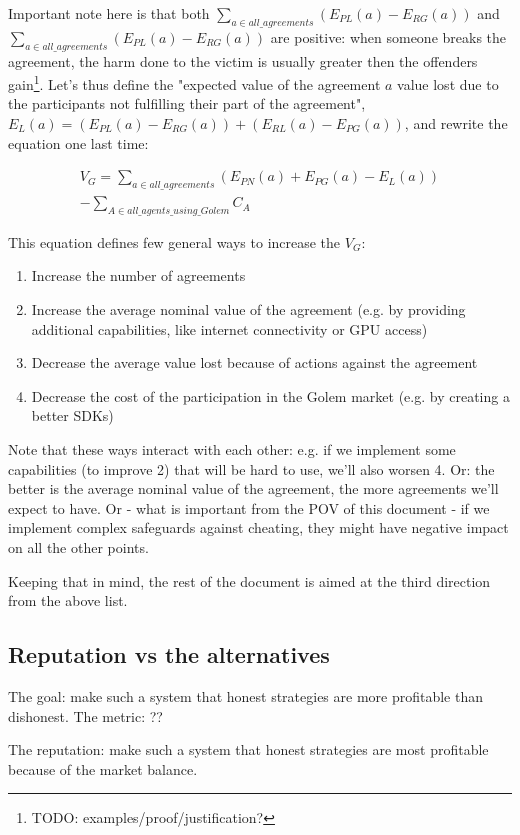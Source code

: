 \documentclass{article}
\begin{document}
Important note here is that both $\sum_{a \in all\_agreements}(E_{PL}(a)- E_{RG}(a))$ and $\sum_{a \in all\_agreements}(E_{PL}(a)- E_{RG}(a))$ are positive: 
when someone breaks the agreement, the harm done to the victim is usually greater then the offenders gain\footnote{TODO: examples/proof/justification?}.
Let's thus define the "expected value of the agreement $a$ value lost due to the participants not fulfilling their part of the agreement", 
$E_L(a) = (E_{PL}(a)- E_{RG}(a)) + (E_{RL}(a)- E_{PG}(a))$, and rewrite the equation one last time:

\begin{equation}
\begin{split}
    V_G = \sum_{a \in all\_agreements}(E_{PN}(a) + E_{PG}(a) - E_L(a)) \\
          - \sum_{A \in all\_agents\_using\_Golem}C_A
\end{split}
\end{equation}

This equation defines few general ways to increase the $V_G$:

\begin{enumerate}
\item Increase the number of agreements
\item Increase the average nominal value of the agreement (e.g. by providing additional capabilities, like internet connectivity or GPU access)
\item Decrease the average value lost because of actions against the agreement
\item Decrease the cost of the participation in the Golem market (e.g. by creating a better SDKs)
\end{enumerate}

Note that these ways interact with each other: e.g. if we implement some capabilities (to improve 2) that will be hard to use, we'll also worsen 4.
Or: the better is the average nominal value of the agreement, the more agreements we'll expect to have.
Or - what is important from the POV of this document - if we implement complex safeguards against cheating, they might have negative impact on all the other points.

Keeping that in mind, the rest of the document is aimed at the third direction from the above list.

\subsection{Reputation vs the alternatives}
The goal: make such a system that honest strategies are more profitable than dishonest.
The metric: ??

The reputation: make such a system that honest strategies are most profitable because of the market balance.
\end{document}
